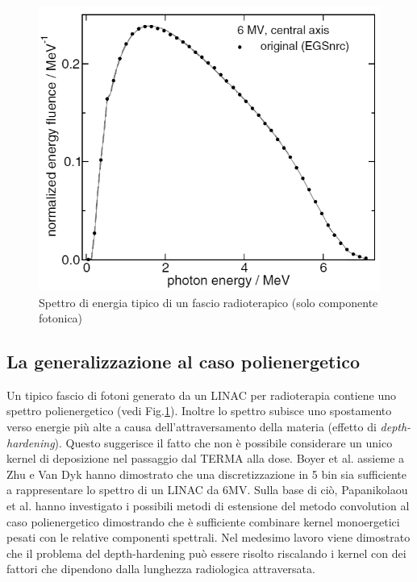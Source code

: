 {\begin{figure}
\centering
\includegraphics[width=\textwidth]{./cap1/LinacSpectrum.png}
\caption{Spettro di energia tipico di un fascio radioterapico (solo componente fotonica)}
\label{fig:LinacSpectrum}
\end{figure}

\subsection{La generalizzazione al caso polienergetico}
Un tipico fascio di fotoni generato da un LINAC per radioterapia contiene uno spettro polienergetico (vedi Fig.\ref{fig:LinacSpectrum}). Inoltre lo spettro subisce uno spostamento verso energie più alte a causa dell'attraversamento della materia (effetto di \textit{depth-hardening}). Questo suggerisce il fatto che non è possibile considerare un unico kernel di deposizione nel passaggio dal TERMA alla dose. Boyer et al. assieme a Zhu e Van Dyk \cite{Boyer1989,Zhu1995} hanno dimostrato che una discretizzazione in 5 bin sia sufficiente a rappresentare lo spettro di un LINAC da 6MV. Sulla base di ciò, Papanikolaou et al. \cite{Papanikolaou1993} hanno investigato i possibili metodi di estensione del metodo convolution al caso polienergetico dimostrando che è sufficiente combinare kernel monoergetici pesati con le relative componenti spettrali. Nel medesimo lavoro viene dimostrato che il problema del depth-hardening può essere risolto riscalando i kernel con dei fattori che dipendono dalla lunghezza radiologica attraversata.

}
